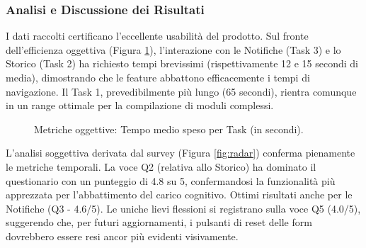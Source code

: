 \documentclass{article}
\begin{document}
\subsubsection{Analisi e Discussione dei Risultati}
I dati raccolti certificano l'eccellente usabilità del prodotto. Sul fronte dell'efficienza oggettiva (Figura \ref{fig:times}), l'interazione con le Notifiche (Task 3) e lo Storico (Task 2) ha richiesto tempi brevissimi (rispettivamente 12 e 15 secondi di media), dimostrando che le feature abbattono efficacemente i tempi di navigazione. Il Task 1, prevedibilmente più lungo (65 secondi), rientra comunque in un range ottimale per la compilazione di moduli complessi.

\begin{figure}[h!]
    \centering
    \caption{Metriche oggettive: Tempo medio speso per Task (in secondi).}
    \label{fig:times}
\end{figure}

L'analisi soggettiva derivata dal survey (Figura \ref{fig:radar}) conferma pienamente le metriche temporali. La voce Q2 (relativa allo Storico) ha dominato il questionario con un punteggio di 4.8 su 5, confermandosi la funzionalità più apprezzata per l'abbattimento del carico cognitivo. Ottimi risultati anche per le Notifiche (Q3 - 4.6/5). Le uniche lievi flessioni si registrano sulla voce Q5 (4.0/5), suggerendo che, per futuri aggiornamenti, i pulsanti di reset delle form dovrebbero essere resi ancor più evidenti visivamente.
\end{document}
